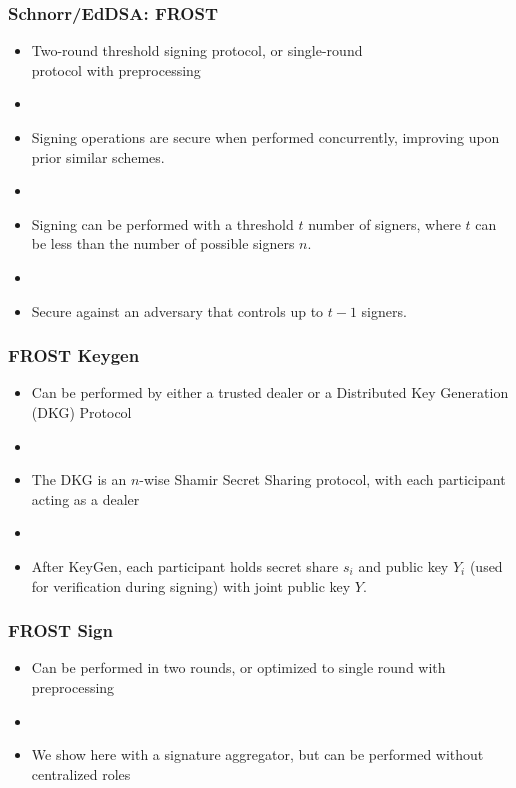 \documentclass[hyperref={pdfpagelabels=true},table,dvipsnames,14pt,aspectratio=169]{beamer}
\begin{document}
\begin{frame}
  \frametitle{Schnorr/EdDSA: FROST}

  \begin{itemize}
    \item<1-> Two-round threshold signing protocol, or single-round \\ protocol with
    preprocessing
    \item[]
    \item<2-> Signing operations are secure when performed concurrently,
      improving upon prior similar schemes.
    \item[]
    \item<3-> Signing can be performed with a threshold $t$ number of signers,
      where $t$ can be less than the number of possible signers $n$.
    \item[]
    \item<4-> Secure against an adversary that controls up to $t-1$ signers.
  \end{itemize}
\end{frame}

\begin{frame}
  \frametitle{FROST Keygen}

  \begin{itemize}
    \item<1-> Can be performed by either a trusted dealer or a Distributed Key
      Generation (DKG) Protocol
    \item[]
    \item<2-> The DKG is an $n$-wise Shamir Secret Sharing protocol, with each
      participant acting as a dealer
    \item[]
    \item<3> After KeyGen, each participant holds secret share $s_i$ and
      public key $Y_i$ (used for verification during signing) with joint public key $Y$.
  \end{itemize}

\end{frame}

\begin{frame}
  \frametitle{FROST Sign}

  \begin{itemize}
    \item<1-> Can be performed in two rounds, or optimized to single round with
      preprocessing
    \item[]
    \item<2-> We show here with a signature aggregator, but can be
      performed without centralized roles
  \end{itemize}
\end{frame}
\end{document}
